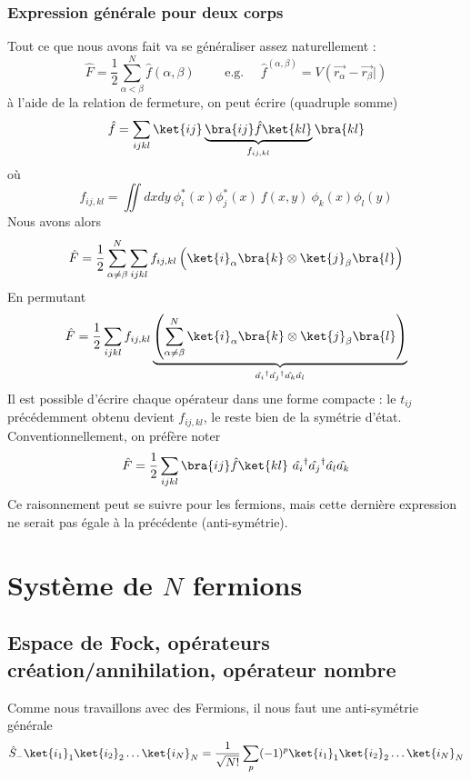 \subsubsection{Expression générale pour deux corps}
Tout ce que nous avons fait va se généraliser assez naturellement :
\begin{equation}
\hat{F} = \frac{1}{2}\sum_{\alpha < \beta}^N \hat{f}(\alpha,\beta)\qquad \text{ e.g. }\quad 
\hat{f}^{(\alpha,\beta)} = V(\vec{r_\alpha}-\vec{r_\beta}|)
\end{equation}
à l'aide de la relation de fermeture, on peut écrire (quadruple somme)
\begin{equation}
\hat{f} = \sum_{ijkl} \ket{ij}\underbrace{\bra{ij}\hat{f}\ket{kl}}_{f_{ij,kl}}\bra{kl}
\end{equation}
où
\begin{equation}
f_{ij,kl} = \iint dxdy\ \phi_i^*(x)\phi_j^*(x)\ f(x,y)\ \phi_k(x)\phi_l(y)
\end{equation}
Nous avons alors
\begin{equation}
\hat{F} =\frac{1}{2}\sum_{\alpha\neq\beta}^N\sum_{ijkl} f_{ij,kl}\left( \ket{i}_\alpha\bra{k}\otimes
\ket{j}_\beta\bra{l}\right)
\end{equation}
En permutant
\begin{equation}
\hat{F} =\frac{1}{2}\sum_{ijkl} f_{ij,kl}\underbrace{\left(\sum_{\alpha\neq\beta}^N \ket{i}_\alpha\bra{k}\otimes
\ket{j}_\beta\bra{l}\right)}_{\hat{a_i}^\dagger\hat{a_j}^\dagger\hat{a_k}\hat{a_l}}
\end{equation}
Il est possible d'écrire chaque opérateur dans une forme compacte : le $t_{ij}$ précédemment obtenu
devient $f_{ij,kl}$, le reste bien de la symétrie d'état. Conventionnellement, on préfère noter
\begin{equation}
\hat{F} =\frac{1}{2}\sum_{ijkl} \bra{ij}\hat{f}\ket{kl}\ \hat{a_i}^\dagger\hat{a_j}^\dagger\hat{a_l}\hat{a_k}
\end{equation}
Ce raisonnement peut se suivre pour les fermions, mais cette dernière expression  ne serait pas égale à
la précédente (anti-symétrie). 



\section{Système de $N$ fermions}
\subsection{Espace de Fock, opérateurs création/annihilation, opérateur nombre}
Comme nous travaillons avec des Fermions, il nous faut une anti-symétrie générale
\begin{equation}
\hat{S}_-\ket{i_1}_1\ket{i_2}_2\dots\ket{i_N}_N = \dfrac{1}{\sqrt{N!}}\sum_p(-1)^p \ket{i_1}_1\ket{i_2}_2\dots\ket{i_N}_N
\end{equation}


